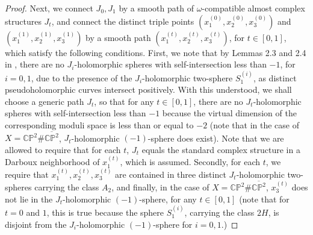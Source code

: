 \documentclass[11pt]{amsart}
\theoremstyle{plain}
\numberwithin{theorem}{section}
\theoremstyle{definition}
\newcommand{\C}{{\mathbb C}}
\renewcommand{\P}{{\mathbb P}}
\begin{document}
\begin{proof}
Next, we connect $J_0,J_1$ by a smooth path of $\omega$-compatible almost complex structures $J_t$, and connect the distinct triple points $(x_1^{(0)},x_2^{(0)},x_3^{(0)})$ and $(x_1^{(1)},x_2^{(1)},x_3^{(1)})$ by a smooth path $(x_1^{(t)},x_2^{(t)},x_3^{(t)})$, for $t\in [0,1]$, which satisfy the following conditions. First, we note that by Lemmas 2.3 and 2.4 in  \cite{C0}, there are no $J_i$-holomorphic spheres with self-intersection less than $-1$, for $i=0,1$, due to the presence of the $J_i$-holomorphic two-sphere $S_1^{(i)}$, as distinct pseudoholomorphic curves intersect positively. With this understood, we shall choose a generic path $J_t$, so that for any $t\in [0,1]$, there are no $J_t$-holomorphic spheres with self-intersection less than $-1$ because the virtual dimension of the corresponding moduli space is less than or equal to $-2$ (note that in the case of $X=\C\P^2\#\overline{\C\P^2}$, $J_t$-holomorphic $(-1)$-sphere does exist). Note that we are allowed to require that for each $t$, $J_t$ equals the standard complex structure in a Darboux neighborhood of $x_1^{(t)}$, which is assumed. Secondly, for each $t$, 
we require that $x_1^{(t)}, x_2^{(t)}, x_3^{(t)}$ are contained in three distinct $J_t$-holomorphic two-spheres carrying the class $A_2$, and finally, in the case of $X=\C\P^2\#\overline{\C\P^2}$, $x_3^{(t)}$ does not lie in the $J_t$-holomorphic $(-1)$-sphere, for any $t\in [0,1]$ (note that for $t=0$ and $1$, this is true because the sphere $S_1^{(i)}$, carrying the class $2H$,  is disjoint from the $J_i$-holomorphic $(-1)$-sphere for $i=0,1$.) 


\end{proof}
\end{document}
